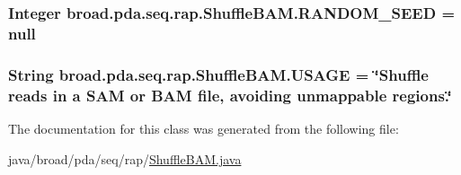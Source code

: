 \hypertarget{classbroad_1_1pda_1_1seq_1_1rap_1_1_shuffle_b_a_m_abb97899b7b215ebc5044c8de2dcdd75f}{
\subsubsection[{R\+A\+N\+D\+O\+M\+\_\+\+S\+E\+E\+D}]{\setlength{\rightskip}{0pt plus 5cm}Integer broad.\+pda.\+seq.\+rap.\+Shuffle\+B\+A\+M.\+R\+A\+N\+D\+O\+M\+\_\+\+S\+E\+E\+D = null}}\label{classbroad_1_1pda_1_1seq_1_1rap_1_1_shuffle_b_a_m_abb97899b7b215ebc5044c8de2dcdd75f}
\hypertarget{classbroad_1_1pda_1_1seq_1_1rap_1_1_shuffle_b_a_m_af9a7333a82eb692c4bf47d824f885891}{
\subsubsection[{U\+S\+A\+G\+E}]{\setlength{\rightskip}{0pt plus 5cm}String broad.\+pda.\+seq.\+rap.\+Shuffle\+B\+A\+M.\+U\+S\+A\+G\+E = \char`\"{}Shuffle reads in a S\+A\+M or B\+A\+M file, avoiding unmappable regions.\char`\"{}}}\label{classbroad_1_1pda_1_1seq_1_1rap_1_1_shuffle_b_a_m_af9a7333a82eb692c4bf47d824f885891}


The documentation for this class was generated from the following file\+:\begin{DoxyCompactItemize}
\item 
java/broad/pda/seq/rap/\hyperlink{_shuffle_b_a_m_8java}{Shuffle\+B\+A\+M.\+java}\end{DoxyCompactItemize}
